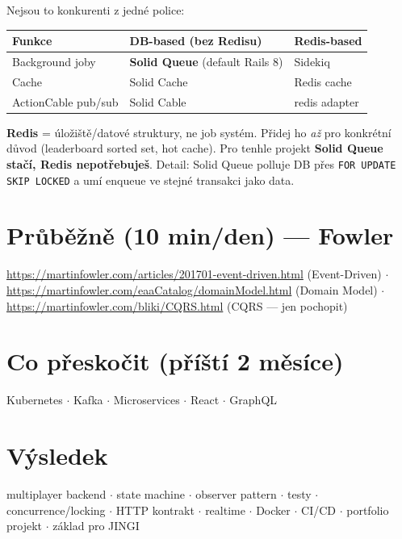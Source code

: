 \documentclass[11pt]{article}
\begin{document}
Nejsou to konkurenti z jedné police:

\begin{longtable}{p{4.2cm} p{4.6cm} p{4.6cm}}
\textbf{Funkce} & \textbf{DB-based (bez Redisu)} & \textbf{Redis-based}\\
\hline
Background joby & \textbf{Solid Queue} (default Rails 8) & Sidekiq\\
Cache & Solid Cache & Redis cache\\
ActionCable pub/sub & Solid Cable & redis adapter\\
\end{longtable}

\textbf{Redis} = úložiště/datové struktury, ne job systém. Přidej ho \emph{až} pro konkrétní
důvod (leaderboard sorted set, hot cache). Pro tenhle projekt \textbf{Solid Queue stačí, Redis
nepotřebuješ}. Detail: Solid Queue polluje DB přes \texttt{FOR UPDATE SKIP LOCKED} a umí
enqueue ve stejné transakci jako data.

\section{Průběžně (10 min/den) — Fowler}

\url{https://martinfowler.com/articles/201701-event-driven.html} (Event-Driven) $\cdot$
\url{https://martinfowler.com/eaaCatalog/domainModel.html} (Domain Model) $\cdot$
\url{https://martinfowler.com/bliki/CQRS.html} (CQRS — jen pochopit)

\section{Co přeskočit (příští 2 měsíce)}

Kubernetes $\cdot$ Kafka $\cdot$ Microservices $\cdot$ React $\cdot$ GraphQL

\section{Výsledek}

multiplayer backend $\cdot$ state machine $\cdot$ observer pattern $\cdot$ testy $\cdot$
concurrence/locking $\cdot$ HTTP kontrakt $\cdot$ realtime $\cdot$ Docker $\cdot$ CI/CD $\cdot$
portfolio projekt $\cdot$ základ pro JINGI
\end{document}
